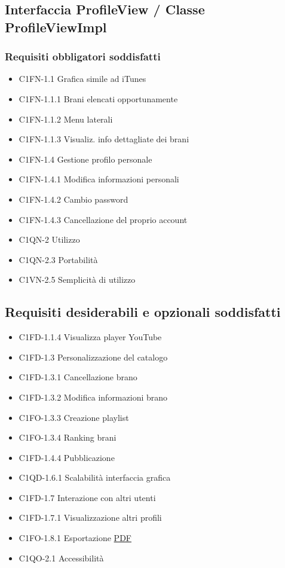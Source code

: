 \subsection{Interfaccia ProfileView / Classe ProfileViewImpl}
\subsubsection*{Requisiti obbligatori soddisfatti}
\begin{itemize}
    \item C1FN-1.1 Grafica simile ad iTunes
	\item C1FN-1.1.1 Brani elencati opportunamente
	\item C1FN-1.1.2 Menu laterali
	\item C1FN-1.1.3 Visualiz. info dettagliate dei brani
    \item C1FN-1.4 Gestione profilo personale
    \item C1FN-1.4.1 Modifica informazioni personali
    \item C1FN-1.4.2 Cambio password
    \item C1FN-1.4.3 Cancellazione del proprio account
    \item C1QN-2 Utilizzo
    \item C1QN-2.3 Portabilit\`a
    \item C1VN-2.5 Semplicit\`a di utilizzo
\end{itemize}
\subsection*{Requisiti desiderabili e opzionali soddisfatti}
\begin{itemize}
    \item C1FD-1.1.4 Visualizza player YouTube
    \item C1FD-1.3 Personalizzazione del catalogo 
    \item C1FD-1.3.1 Cancellazione brano
    \item C1FD-1.3.2 Modifica informazioni brano
    \item C1FO-1.3.3 Creazione playlist  
    \item C1FO-1.3.4 Ranking brani  
    \item C1FD-1.4.4 Pubblicazione
    \item C1QD-1.6.1 Scalabilit\`a interfaccia grafica
    \item C1FD-1.7 Interazione con altri utenti
    \item C1FD-1.7.1 Visualizzazione altri profili
    \item C1FO-1.8.1 Esportazione \underline{PDF}
    \item C1QO-2.1 Accessibilit\`a
\end{itemize}
